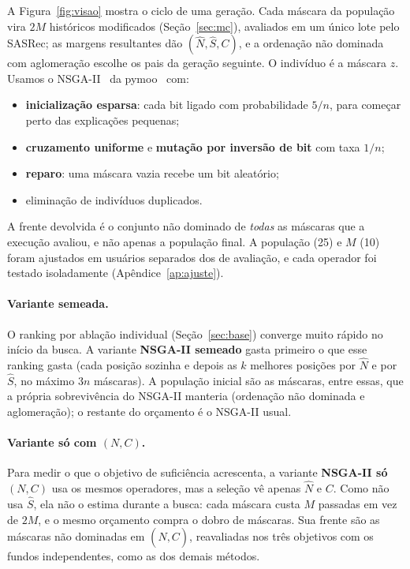A Figura~\ref{fig:visao} mostra o ciclo de uma geração. Cada máscara da
população vira $2M$ históricos modificados (Seção~\ref{sec:mc}), avaliados em
um único lote pelo SASRec; as margens resultantes dão $(\hat N,\hat S,C)$, e a
ordenação não dominada com aglomeração escolhe os pais da geração seguinte. O
indivíduo é a máscara $z$. Usamos o
NSGA-II~\cite{deb2002nsga2} da pymoo~\cite{blank2020pymoo} com:
\begin{itemize}
  \item \textbf{inicialização esparsa}: cada bit ligado com probabilidade
        $5/n$, para começar perto das explicações pequenas;
  \item \textbf{cruzamento uniforme} e \textbf{mutação por inversão de bit} com
        taxa $1/n$;
  \item \textbf{reparo}: uma máscara vazia recebe um bit aleatório;
  \item eliminação de indivíduos duplicados.
\end{itemize}
A frente devolvida é o conjunto não dominado de \emph{todas} as máscaras que a
execução avaliou, e não apenas a população final. A população (25) e $M$ (10)
foram ajustados em usuários separados dos de avaliação, e cada operador foi
testado isoladamente (Apêndice~\ref{ap:ajuste}).

\paragraph{Variante semeada.}
O ranking por ablação individual (Seção~\ref{sec:base}) converge muito rápido
no início da busca. A variante \textbf{NSGA-II semeado} gasta primeiro o que
esse ranking gasta (cada posição sozinha e depois as $k$ melhores posições por
$\hat N$ e por $\hat S$, no máximo $3n$ máscaras). A população inicial são as
máscaras, entre essas, que a própria sobrevivência do NSGA-II manteria
(ordenação não dominada e aglomeração); o restante do orçamento é o NSGA-II
usual.

\paragraph{Variante só com $(N,C)$.}
Para medir o que o objetivo de suficiência acrescenta, a variante
\textbf{NSGA-II só $(N,C)$} usa os mesmos operadores, mas a seleção vê apenas
$\hat N$ e $C$. Como não usa $\hat S$, ela não o estima durante a busca: cada
máscara custa $M$ passadas em vez de $2M$, e o mesmo orçamento compra o dobro de
máscaras. Sua frente são as máscaras não dominadas em $(\hat N, C)$,
reavaliadas nos três objetivos com os fundos independentes, como as dos demais
métodos.

